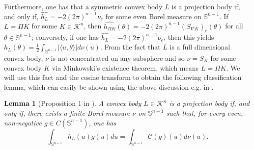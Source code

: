 \documentclass[11pt]{amsart}
\newtheorem{lemma}[theorem]{Lemma}
\theoremstyle{definition}
\theoremstyle{remark}
\numberwithin{equation}{section}
\newcommand{\s}{\mathbb{S}}
\newcommand{\conbod}{\mathcal{K}^n}
\newcommand{\ct}[2]{\mathcal{C}({#1})({#2})}
\begin{document}
Furthermore, one has that a symmetric convex body $L$ is a projection body if, and only if, $\widehat{h_L}=-2(2\pi)^{n-1}\nu_e$ for some even Borel measure on $\s^{n-1}.$ If $L=\Pi K$ for some $K\in\conbod$, then $\widehat{h_{\Pi K}}(\theta)=-2(2\pi)^{n-1}(S_{\nabla K})_e(\theta)$ for all $\theta\in\s^{n-1}$; conversely, if one has $\widehat{h_L}=-2(2\pi)^{n-1}\nu_e$, then this yields $h_L(\theta)=\frac{1}{2}\int_{\s^{n-1}}|\langle u,\theta \rangle|d\nu(u)$. From the fact that $L$ is a full dimensional convex body, $\nu$ is not concentrated on any subsphere and so $\nu=S_K$ for some convex body $K$ via Minkowski's existence theorem, which means $L=\Pi K$. We will use this fact and the cosine transform to obtain the following classification lemma, which can easily be shown using the above discussion e.g. in \cite{KRZ04_2}.
\begin{lemma}[Proposition 1 in \cite{KRZ04_2}]
\label{l:proj_meas}
A convex body $L\in\conbod$ is a projection body if, and only if, there exists a finite Borel measure $\nu$ on $\s^{n-1}$ such that, for every even, non-negative $g\in C(\s^{n-1})$, one has
$$\int_{\s^{n-1}} h_L(u) g(u) du = \int_{\s^{n-1}} \ct{g}{u} d\nu(u).$$
\end{lemma}
\end{document}
